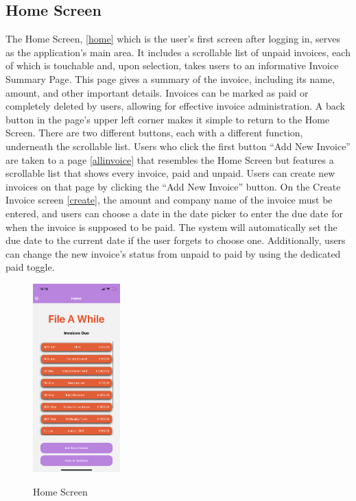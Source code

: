\subsection{Home Screen}
The Home Screen, \ref{home} which is the user's first screen after logging in, serves as the application's main area. It includes a scrollable list of unpaid invoices, each of which is touchable and, upon selection, takes users to an informative Invoice Summary Page. This page gives a summary of the invoice, including its name, amount, and other important details. Invoices can be marked as paid or completely deleted by users, allowing for effective invoice administration. A back button in the page's upper left corner makes it simple to return to the Home Screen.
\newline \newline
There are two different buttons, each with a different function, underneath the scrollable list. Users who click the first button “Add New Invoice” are taken to a page \ref{allinvoice} that resembles the Home Screen but features a scrollable list that shows every invoice, paid and unpaid. Users can create new invoices on that page by clicking the “Add New Invoice” button. On the Create Invoice screen \ref{create}, the amount and company name of the invoice must be entered, and users can choose a date in the date picker to enter the due date for when the invoice is supposed to be paid. The system will automatically set the due date to the current date if the user forgets to choose one. Additionally, users can change the new invoice's status from unpaid to paid by using the dedicated paid toggle.
\begin{figure}[h!]
    \includegraphics[width=0.3\textwidth]
    {images/Home.png}
    \centering
    \label{image:home}
    \caption{Home Screen}
\end{figure}
